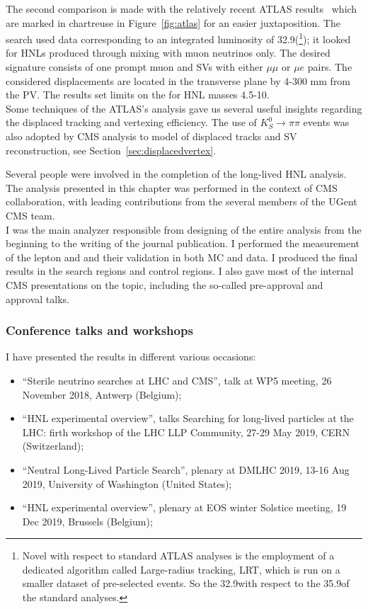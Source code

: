 The second comparison is made with the relatively recent ATLAS
results~\cite{atlas_ll} which are marked in chartreuse in
Figure~\ref{fig:atlas} for an easier juxtaposition. The search used
data corresponding to an integrated
luminosity of 32.9\fbinv(\footnote{Novel
with respect to standard ATLAS analyses is the employment of a
dedicated algorithm called Large-radius tracking, LRT, which is run on
a smaller dataset of pre-selected events. So the 32.9\fbinv with
respect to the 35.9\fbinv of the standard analyses.}); it looked for HNLs produced through mixing with
muon neutrinos only. The desired signature consists of one prompt muon and SVs
with either $\mu \mu$ or $\mu e$ pairs. The considered displacements
are located in the transverse plane by 4-300 mm from the PV. The
results set limits on the \mixparm for HNL masses 4.5-10\GeV.\\
Some techniques of the ATLAS's analysis gave us several useful
insights regarding the displaced tracking and vertexing
efficiency. The use of $K_S^{0} \rightarrow \pi \pi$ events was also
adopted by CMS analysis to model of displaced tracks
and SV reconstruction, see Section~\ref{sec:displacedvertex}.\\




\vspace{1.5cm}

Several people were involved in the completion of the long-lived HNL
analysis.\\
The analysis presented in this chapter was performed in the context of
CMS collaboration, with leading contributions from the several members
of the UGent CMS team.\\
I was the main analyzer responsible from designing of the entire analysis  from the beginning to the writing of the journal publication. I performed the measurement of the
lepton \fr and \Dfr and their validation in both MC and data. I
produced the final results in the search regions and control
regions. I also
gave most of the internal CMS presentations on the topic, including the
so-called pre-approval and approval talks.
\subsubsection*{Conference talks and workshops}
I have presented the results in different various occasions:
\begin{itemize}
\item ``Sterile neutrino searches at LHC and CMS'', talk at WP5
  meeting, 26 November 2018, Antwerp (Belgium);
\item ``HNL experimental overview'', talks Searching for long-lived
  particles at the LHC: firth workshop of the LHC LLP Community, 27-29
  May 2019, CERN (Switzerland);
\item ``Neutral Long-Lived Particle Search'', plenary at DM\@ LHC 2019, 13-16 Aug 2019, University of Washington (United States);
\item ``HNL experimental overview'', plenary at EOS winter Solstice
  meeting, 19 Dec 2019, Brussels (Belgium);
\end{itemize}

